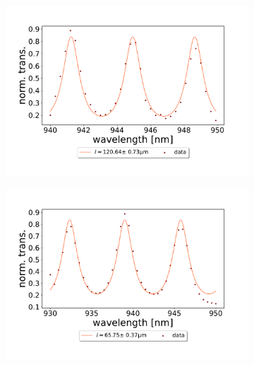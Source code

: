\begin{figure}[h!]
\begin{subfigure}[b]{0.49\textwidth}
        \includegraphics[width=\textwidth]{figures/results/double fano fits/120um_M3:M5_FSR_scan.pdf}
        \caption{}
        \label{fig:120um_M3:M5_FSR_scan}
    \end{subfigure}
    \begin{subfigure}[b]{0.49\textwidth}
        \includegraphics[width=\textwidth]{figures/results/double fano fits/70um_M3:M5_FSR_scan.pdf}
        \caption{}
        \label{fig:70um_M3:M5_FSR_scan}
    \end{subfigure}
\end{figure}
